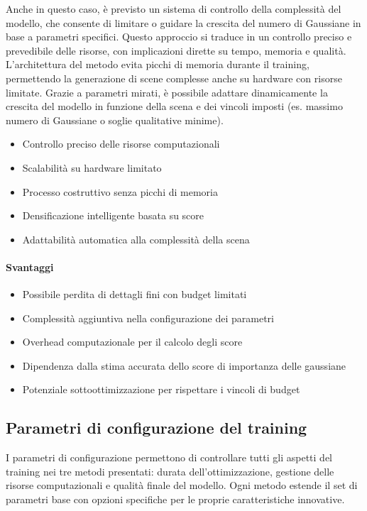 Anche in questo caso, è previsto un sistema di controllo della complessità del modello, che consente di limitare o guidare la crescita del numero di Gaussiane in base a parametri specifici. Questo approccio si traduce in un controllo preciso e prevedibile delle risorse, con implicazioni dirette su tempo, memoria e qualità. L'architettura del metodo evita picchi di memoria durante il training, permettendo la generazione di scene complesse anche su hardware con risorse limitate. Grazie a parametri mirati, è possibile adattare dinamicamente la crescita del modello in funzione della scena e dei vincoli imposti (es. massimo numero di Gaussiane o soglie qualitative minime).
\mbox{}\\
\begin{itemize}
	\item Controllo preciso delle risorse computazionali
	\item Scalabilità su hardware limitato
	\item Processo costruttivo senza picchi di memoria
	\item Densificazione intelligente basata su score
	\item Adattabilità automatica alla complessità della scena
\end{itemize}

\paragraph{Svantaggi}
\begin{itemize}
	\item Possibile perdita di dettagli fini con budget limitati
	\item Complessità aggiuntiva nella configurazione dei parametri
	\item Overhead computazionale per il calcolo degli score
	\item Dipendenza dalla stima accurata dello score di importanza delle gaussiane
	\item Potenziale sottoottimizzazione per rispettare i vincoli di budget
\end{itemize}

\subsection{Parametri di configurazione del training}
I parametri di configurazione permettono di controllare tutti gli aspetti del training nei tre metodi presentati: durata dell'ottimizzazione, gestione delle risorse computazionali e qualità finale del modello. Ogni metodo estende il set di parametri base con opzioni specifiche per le proprie caratteristiche innovative.

